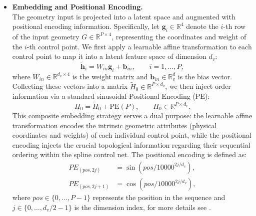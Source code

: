 \documentclass{article}
\newcommand{\R}{\mathbb{R}}
\newcommand{\Dlat}{d_v} %
\theoremstyle{plain}
\numberwithin{equation}{section}
\begin{document}
\begin{itemize}
    \item \textbf{Embedding and Positional Encoding.}\\
          The geometry input is projected into a latent space and augmented with positional encoding information. Specifically, let $\mathbf{g}_i \in \R^4$ denote the $i$-th row of the input geometry $G \in \R^{P \times 4}$, representing the coordinates and weight of the $i$-th control point. We first apply a learnable affine transformation to each control point to map it into a latent feature space of dimension $\Dlat$:
          \begin{equation*}
              \widetilde{\mathbf{h}}_i = W_{in} \mathbf{g}_i + \mathbf{b}_{in}, \qquad i=1,\ldots,P,
          \end{equation*}
          where $W_{in} \in \R^{\Dlat \times 4}$ is the weight matrix and $\mathbf{b}_{in} \in \R^\Dlat$ is the bias vector. Collecting these vectors into a matrix $\tilde{H}_0 \in \R^{P \times \Dlat}$, we then inject order information via a standard sinusoidal Positional Encoding (PE):
          \begin{equation*}
              H_0 = \widetilde{H}_0 + \text{PE}(P), \qquad H_0 \in \R^{P \times \Dlat}.
          \end{equation*}
          This composite embedding strategy serves a dual purpose: the learnable affine transformation encodes the intrinsic geometric attributes (physical coordinates and weights) of each individual control point, while the positional encoding injects the crucial topological information regarding their sequential ordering within the spline control net. The positional encoding is defined as:
          \begin{equation*}
              \begin{aligned}
                  PE_{(pos, 2j)}   & = \sin(pos / 10000^{2j/\Dlat}), \\
                  PE_{(pos, 2j+1)} & = \cos(pos / 10000^{2j/\Dlat}),
              \end{aligned}
          \end{equation*}
          where $pos \in \{0, \dots, P-1\}$ represents the position in the sequence and $j \in \{0, \dots, \Dlat/2 - 1\}$ is the dimension index, for more details see \cite{vaswani2017attention}.


\end{itemize}
\end{document}
